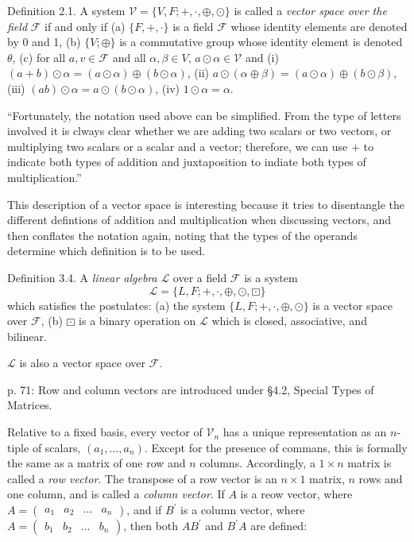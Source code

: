 Definition 2.1. A system $\mathcal V = \{V, F; +, \cdot, \oplus, \odot\}$ is called a \textit{vector space over the field} $\mathcal F$ if and only if
(a) $\{F, +, \cdot\}$ is a field $\mathcal F$ whose identity elements are denoted by 0 and 1,
(b) $\{V; \oplus\}$ is a commutative group whose identity element is denoted $\theta$,
(c) for all $a,v\in\mathcal F$ and all $\alpha, \beta \in V$, $a \odot  \alpha \in \mathcal V$ and
(i) $(a + b) \odot \alpha = (a \odot \alpha) \oplus (b \odot \alpha)$,
(ii) $a \odot (\alpha \oplus \beta) = (a \odot \alpha) \oplus (b \odot \beta)$,
(iii) $(ab) \odot \alpha = a \odot (b \odot \alpha)$,
(iv) $1 \odot \alpha = \alpha$.

``Fortunately, the notation used above can be simplified. From the type of letters involved it is clways clear whether we are adding two scalars or two vectors, or multiplying two scalars or a scalar and a vector; therefore, we can use $+$ to indicate both types of addition and juxtaposition to indiate both types of multiplication.''

This description of a vector space is interesting because it tries to disentangle the different defintions of addition and multiplication when discussing vectors, and then conflates the notation again, noting that the types of the operands determine which definition is to be used.

Definition 3.4. A \textit{linear algebra} $\mathcal L$ over a field $\mathcal F$ is a system
\[
\mathcal L = \{L, F; +, \cdot, \oplus, \odot, \boxdot\}
\]
which satisfies the postulates:
(a) the system $\{L, F; +, \cdot, \oplus, \odot\}$ is a vector space over $\mathcal F$,
(b) $\boxdot$ is a binary operation on $\mathcal L$ which is closed, associative, and bilinear.

$\mathcal L$ is also a vector space over $\mathcal F$.


p. 71: Row and column vectors are introduced under \S 4.2, Special Types of Matrices.

Relative to a fixed basis, every vector of $\mathcal V_n$ has a unique representation as an $n$-tiple of scalars, $(a_1, \dots, a_n)$. Except for the presence of commans, this is formally the same as a matrix of one row and $n$ columns. Accordingly, a $1\times n$ matrix is called a \textit{row vector}. The transpose of a row vector is an $n \times1$ matrix, $n$ rows and one column, and is called a \textit{column vector}. If $A$ is a reow vector, where $A = \begin{pmatrix} a_1 & a_2 & \ldots & a_n\end{pmatrix}$, and if $B^\prime$ is a column vector, where $A = \begin{pmatrix} b_1 & b_2 & \ldots & b_n\end{pmatrix}$, then both $AB^\prime$ and $B^\prime A$ are defined:


